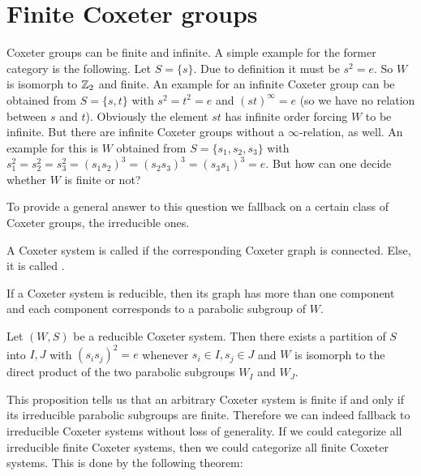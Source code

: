 \section{Finite Coxeter groups}
\label{sec:coxeter-groups-finite}

Coxeter groups can be finite and infinite. A simple example for the former category is the following. Let $S = \{ s \}$. Due to definition it must be $s^2 = e$. So $W$ is isomorph to $\mathbb{Z}_2$ and finite. An example for an infinite Coxeter group can be obtained from $S = \{s,t\}$ with $s^2=t^2=e$ and $(st)^\infty = e$ (so we have no relation between $s$ and $t$). Obviously the element $st$ has infinite order forcing $W$ to be infinite. But there are infinite Coxeter groups without a $\infty$-relation, as well. An example for this is $W$ obtained from $S=\{s_1,s_2,s_3\}$ with $s_1^2=s_2^2=s_3^2=(s_1 s_2)^3=(s_2 s_3)^3=(s_3 s_1)^3=e$. But how can one decide whether $W$ is finite or not?

To provide a general answer to this question we fallback on a certain class of Coxeter groups, the irreducible ones.

\begin{defi}
	A Coxeter system is called  if the corresponding Coxeter graph is connected. Else, it is called .
\end{defi}

If a Coxeter system is reducible, then its graph has more than one component and each component corresponds to a parabolic subgroup of $W$. 

\begin{prop}
	Let $(W,S)$ be a reducible Coxeter system. Then there exists a partition of $S$ into $I,J$ with $(s_i s_j)^2 = e$ whenever $s_i \in I, s_j \in J$ and $W$ is isomorph to the direct product of the two parabolic subgroups $W_I$ and $W_J$.
\end{prop}

This proposition tells us that an arbitrary Coxeter system is finite if and only if its irreducible parabolic subgroups are finite. Therefore we can indeed fallback to irreducible Coxeter systems without loss of generality. If we could categorize all irreducible finite Coxeter systems, then we could categorize all finite Coxeter systems. This is done by the following theorem:

